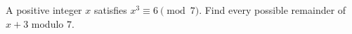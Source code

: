 A positive integer $x$ satisfies $x^3\equiv6\pmod7$. Find every possible remainder of $x+3$ modulo $7$.

